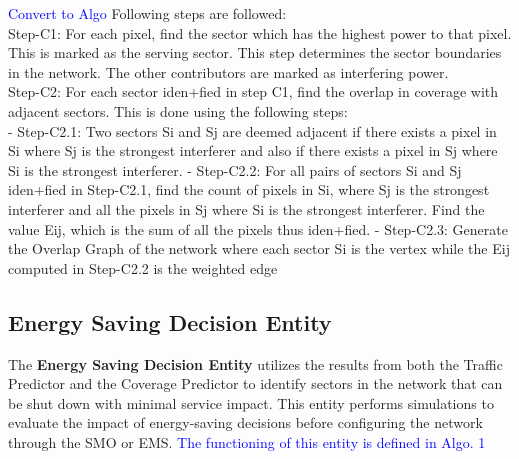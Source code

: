 \documentclass[conference]{IEEEtran}
\begin{document}
\textcolor{blue}{Convert to Algo}
Following steps are followed: \\
Step-C1: For each pixel, find the sector which has the highest power to that pixel. This is marked as the serving sector. This step determines the sector boundaries in the network. The other contributors are marked as interfering power. \\
Step-C2: For each sector iden+fied in step C1, find the overlap in coverage with adjacent sectors. This is done using the following steps: \\
	- Step-C2.1: Two sectors Si and Sj are deemed adjacent if there exists a pixel in Si where Sj is the strongest interferer and also if there exists a pixel in Sj where Si is the strongest interferer.
	- Step-C2.2: For all pairs of sectors Si and Sj iden+fied in Step-C2.1, find the count of pixels in Si, where Sj is the strongest interferer and all the pixels in Sj where Si is the strongest interferer. Find the value Eij, which is the sum of all the pixels thus iden+fied.
	- Step-C2.3: Generate the Overlap Graph of the network where each sector Si is the vertex while the Eij computed in Step-C2.2 is the weighted edge

\begin{comment}
\begin{algorithm} [H]
\caption{Coverage Predictor}
\label{alg:control_application}
\SetKwInOut{Input}{Input}
\SetKwInOut{Output}{Output}

\Input{DecisionVariables}

\SetKwProg{Fn}{Function \emph{applyControl}}{}{end}
\Fn{}{
    delay $\gets$ EWMA(delay, delay_in)\;
    
    \While{True}
    {
        \If{$condition1$}
        {
            \Return{$CellBringup$}\;
        }
        \ElseIf{$condition2$}
        {
            \Return{$CellShutdown$}\;
        }
        \Else
        {
            $NoChange$\;
        }
    }
}

\Output{$Control\_Action$} %

\end{algorithm}
\end{comment}


\subsection{Energy Saving Decision Entity}

The \textbf{Energy Saving Decision Entity} utilizes the results from both the Traffic Predictor and the Coverage Predictor to identify sectors in the network that can be shut down with minimal service impact. This entity performs simulations to evaluate the impact of energy-saving decisions before configuring the network through the SMO or EMS. \textcolor{blue}{The functioning of this entity is defined in Algo. 1}
\end{document}
